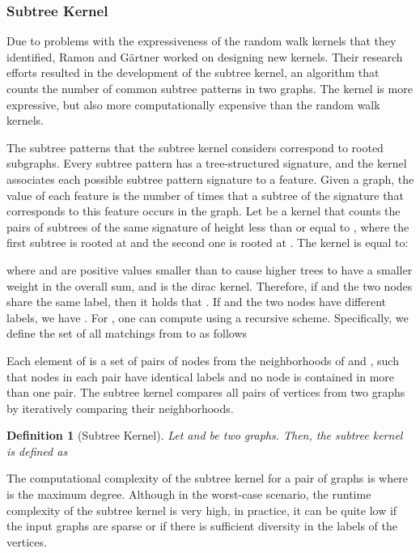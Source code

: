 \documentclass[twoside,11pt]{article}
\newtheorem{definition}{Definition}
\begin{document}
\subsubsection{Subtree Kernel}
Due to problems with the expressiveness of the random walk kernels that they identified, Ramon and G{\"a}rtner \citeyear{ramon2003expressivity} worked on designing new kernels.
Their research efforts resulted in the development of the subtree kernel, an algorithm that counts the number of common subtree patterns in two graphs.
The kernel is more expressive, but also more computationally expensive than the random walk kernels.

The subtree patterns that the subtree kernel considers correspond to rooted subgraphs.
Every subtree pattern has a tree-structured signature, and the kernel associates each possible subtree pattern signature to a feature.
Given a graph, the value of each feature is the number of times that a subtree of the signature that corresponds to this feature occurs in the graph.
Let  be a kernel that counts the pairs of subtrees of the same signature of height less than or equal to , where the first subtree is rooted at  and the second one is rooted at .
The kernel  is equal to:

where  and  are positive values smaller than  to cause higher trees to have a smaller weight in the overall sum, and  is the dirac kernel.
Therefore, if  and the two nodes share the same label, then it holds that .
If  and the two nodes have different labels, we have .
For , one can compute  using a recursive scheme.
Specifically, we define the set of all matchings from  to  as follows

Each element  of  is a set of pairs of nodes from the neighborhoods of  and , such that nodes in each pair have identical labels and no node is contained in more than one pair.
The subtree kernel compares all pairs of vertices from two graphs by iteratively comparing their neighborhoods.
\begin{definition}[Subtree Kernel]
  Let  and  be two graphs.
  Then, the subtree kernel is defined as
  
\end{definition}
The computational complexity of the subtree kernel for a pair of graphs is  where  is the maximum degree.
Although in the worst-case scenario, the runtime complexity of the subtree kernel is very high, in practice, it can be quite low if the input graphs are sparse or if there is sufficient diversity in the labels of the vertices.
\end{document}
